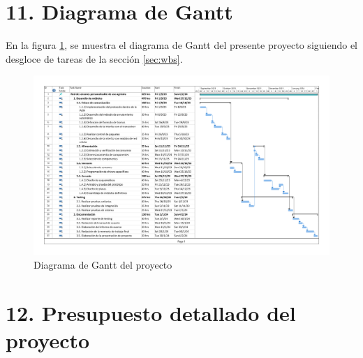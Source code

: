\documentclass[
11pt, %
codirector, %
]{charter}
\begin{document}
\section{11. Diagrama de Gantt}
\label{sec:gantt}

En la figura \ref{fig:diagGantt}, se muestra el diagrama de Gantt del presente proyecto siguiendo el desgloce de tareas de la sección \ref{sec:wbs}.

\begin{landscape}
\begin{figure}[htpb]
\centering 
\includegraphics[height=.90\textheight]{./Figuras/gantt.pdf}
\caption{Diagrama de Gantt del proyecto}
\label{fig:diagGantt}
\end{figure}

\end{landscape}


\section{12. Presupuesto detallado del proyecto}
\label{sec:presupuesto}
\end{document}
